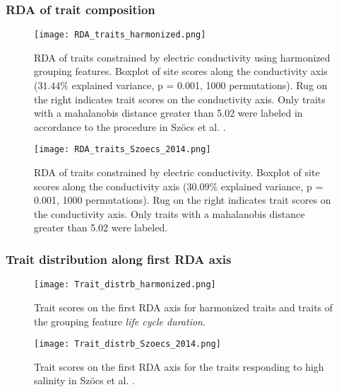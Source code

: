 \documentclass[../Draft_harmonization_paper.tex]{subfiles}
\begin{document}
\subsubsection*{RDA of trait composition}

\begin{figure}[H]
    \centering
    \texttt{[image: RDA\_traits\_harmonized.png]}
    \caption{RDA of traits constrained by electric conductivity using harmonized grouping features. Boxplot of site scores along the conductivity axis ($31.44 \%$ explained variance, p = 0.001, 1000 permutations). Rug on the right indicates trait scores on the conductivity axis. Only traits with a mahalanobis distance greater than 5.02 were labeled in accordance to the procedure in Szöcs et al. \cite{szocs_effects_2014}.
    } 
\end{figure}

\begin{figure}[H]
    \centering
    \texttt{[image: RDA\_traits\_Szoecs\_2014.png]}
    \caption{RDA of traits constrained by electric conductivity. Boxplot of site scores along the conductivity axis ($30.09 \%$ explained variance, p = 0.001, 1000 permutations). Rug on the right indicates trait scores on the conductivity axis. Only traits with a mahalanobis distance greater than 5.02 were labeled.
    } 
\end{figure}

\subsubsection*{Trait distribution along first RDA axis} 


\begin{figure}[H]
    \centering
    \texttt{[image: Trait\_distrb\_harmonized.png]}
    \caption{Trait scores on the first RDA axis for harmonized traits and traits of the grouping feature \textit{life cycle duration}.
    } 
\end{figure}

\begin{figure}[H]
    \centering
    \texttt{[image: Trait\_distrb\_Szoecs\_2014.png]}
    \caption{Trait scores on the first RDA axis for the traits responding to high salinity in Szöcs et al. \cite{szocs_effects_2014}
    .
    }
\end{figure}
\end{document}
